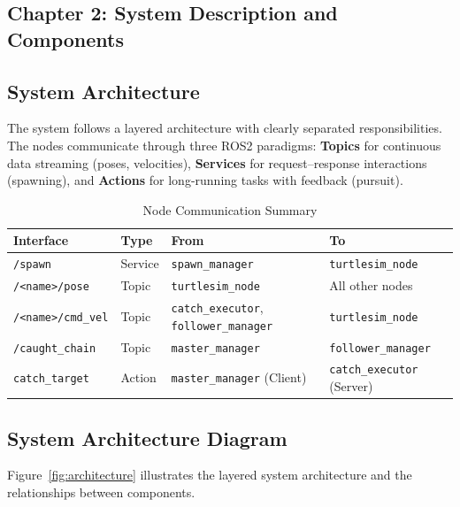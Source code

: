 \documentclass{article}
\begin{document}
\begin{homeworkProblem}[2]
\section{Chapter 2: System Description and Components}

\subsection{System Architecture}

The system follows a layered architecture with clearly separated responsibilities. The nodes communicate through three ROS2 paradigms: \textbf{Topics} for continuous data streaming (poses, velocities), \textbf{Services} for request--response interactions (spawning), and \textbf{Actions} for long-running tasks with feedback (pursuit).

\begin{table}[H]
\centering
\caption{Node Communication Summary}
\label{tab:communication}
\begin{tabular}{llll}
\toprule
\textbf{Interface} & \textbf{Type} & \textbf{From} & \textbf{To} \\
\midrule
\texttt{/spawn} & Service & \texttt{spawn\_manager} & \texttt{turtlesim\_node} \\
\texttt{/<name>/pose} & Topic & \texttt{turtlesim\_node} & All other nodes \\
\texttt{/<name>/cmd\_vel} & Topic & \texttt{catch\_executor}, \texttt{follower\_manager} & \texttt{turtlesim\_node} \\
\texttt{/caught\_chain} & Topic & \texttt{master\_manager} & \texttt{follower\_manager} \\
\texttt{catch\_target} & Action & \texttt{master\_manager} (Client) & \texttt{catch\_executor} (Server) \\
\bottomrule
\end{tabular}
\end{table}

\subsection{System Architecture Diagram}

Figure~\ref{fig:architecture} illustrates the layered system architecture and the relationships between components.


\end{homeworkProblem}
\end{document}
